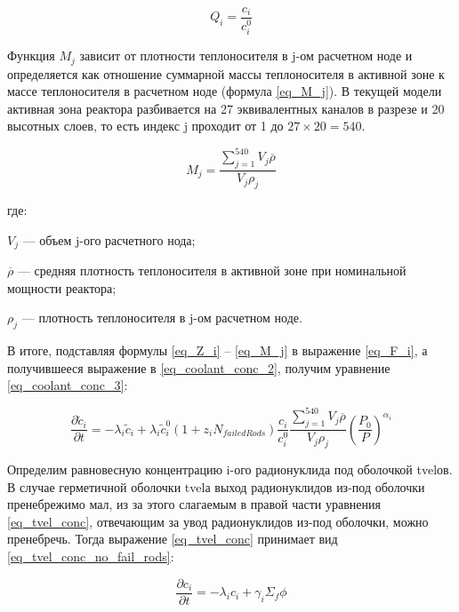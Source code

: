 \begin{equation}
    \label{eq_Q_i}
    Q_{i} = \frac{c_{i}}{c_{i}^{0}}
\end{equation}

Функция $M_{j}$ зависит от плотности теплоносителя в j-ом расчетном ноде и определяется как отношение суммарной массы 
теплоносителя в активной зоне к массе теплоносителя в расчетном ноде (формула \ref{eq_M_j}). В текущей модели активная 
зона реактора разбивается на 27 эквивалентных каналов в разрезе и 20 высотных слоев, то есть индекс j проходит от 1 до 
$27 \times 20 = 540$.

\begin{equation}
    \label{eq_M_j}
    M_{j} = \frac{\sum_{j=1}^{540} V_{j}\overline{\rho}}{V_{j}\rho_{j}}
\end{equation}

где:
\begin{description}
    \item $V_{j}$ --- объем j-ого расчетного нода;
    \item $\overline{\rho}$ --- средняя плотность теплоносителя в активной зоне при номинальной мощности реактора;
    \item $\rho_{j}$ --- плотность теплоносителя в j-ом расчетном ноде.
\end{description}

В итоге, подставляя формулы \ref{eq_Z_i} -- \ref{eq_M_j} в выражение \ref{eq_F_i}, а получившееся выражение в 
\ref{eq_coolant_conc_2}, получим уравнение \ref{eq_coolant_conc_3}:

\begin{equation}
    \label{eq_coolant_conc_3}
    \frac{\partial \widetilde{c}_{i}}{\partial t} = -\lambda_{i}\widetilde{c}_{i} + \lambda_{i}\widetilde{c}_{i}^{0}
        (1 + z_{i}N_{failedRods})\frac{c_{i}}{c_{i}^{0}}\frac{\sum_{j=1}^{540} V_{j}\overline{\rho}}{V_{j}\rho_{j}}
        (\frac{P_{0}}{P})^{\alpha_{i}}
\end{equation}

Определим равновесную концентрацию i-ого радионуклида под оболочкой \ac{tvel}ов. В случае герметичной оболочки 
\ac{tvel}а выход радионуклидов из-под оболочки пренебрежимо мал, из за этого слагаемым в правой части уравнения 
\ref{eq_tvel_conc}, отвечающим за увод радионуклидов из-под оболочки, можно пренебречь. Тогда выражение 
\ref{eq_tvel_conc} принимает вид \ref{eq_tvel_conc_no_fail_rods}: 

\begin{equation}
    \label{eq_tvel_conc_no_fail_rods}
    \frac{\partial c_{i}}{\partial t} = -\lambda_{i}c_{i} + \gamma_{i}\Sigma_{f}\phi
\end{equation}

